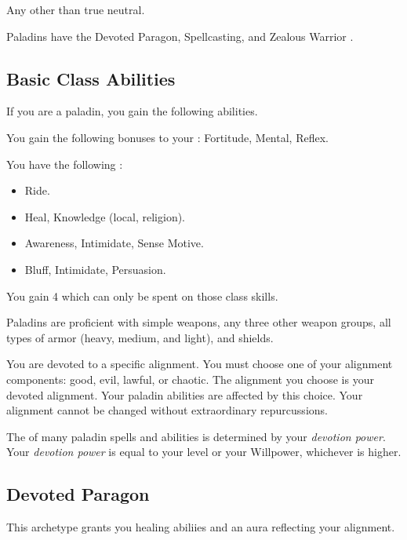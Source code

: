      Any other than true neutral.

     Paladins have the Devoted Paragon, Spellcasting, and Zealous Warrior .

    \subsection{Basic Class Abilities}
        If you are a paladin, you gain the following abilities.

        You gain the following bonuses to your :  Fortitude,  Mental,  Reflex.

        You have the following :
        \begin{itemize}
            \item {} Ride.
            \item {} Heal, Knowledge (local, religion).
            \item {} Awareness, Intimidate, Sense Motive.
            \item {} Bluff, Intimidate, Persuasion.
        \end{itemize}
        You gain 4  which can only be spent on those class skills.

        Paladins are proficient with simple weapons, any three other weapon groups, all types of armor (heavy, medium, and light), and shields.

        You are devoted to a specific alignment.
        You must choose one of your alignment components: good, evil, lawful, or chaotic.
        The alignment you choose is your devoted alignment.
        Your paladin abilities are affected by this choice.
        Your alignment cannot be changed without extraordinary repurcussions.

        The  of many paladin spells and abilities is determined by your \textit{devotion power}.
        Your \textit{devotion power} is equal to your level or your Willpower, whichever is higher.

    \subsection{Devoted Paragon}
        This archetype grants you healing abiliies and an aura reflecting your alignment.

